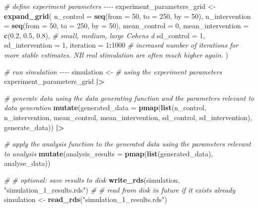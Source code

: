 \documentclass[
]{article}
\newenvironment{Shaded}{\begin{snugshade}}{\end{snugshade}}
\newcommand{\AttributeTok}[1]{\textcolor[rgb]{0.13,0.29,0.53}{#1}}
\newcommand{\CommentTok}[1]{\textcolor[rgb]{0.56,0.35,0.01}{\textit{#1}}}
\newcommand{\DecValTok}[1]{\textcolor[rgb]{0.00,0.00,0.81}{#1}}
\newcommand{\FloatTok}[1]{\textcolor[rgb]{0.00,0.00,0.81}{#1}}
\newcommand{\FunctionTok}[1]{\textcolor[rgb]{0.13,0.29,0.53}{\textbf{#1}}}
\newcommand{\NormalTok}[1]{#1}
\newcommand{\OtherTok}[1]{\textcolor[rgb]{0.56,0.35,0.01}{#1}}
\newcommand{\SpecialCharTok}[1]{\textcolor[rgb]{0.81,0.36,0.00}{\textbf{#1}}}
\newcommand{\StringTok}[1]{\textcolor[rgb]{0.31,0.60,0.02}{#1}}
\begin{document}
\begin{Shaded}
\begin{Highlighting}[]
\CommentTok{\# define experiment parameters {-}{-}{-}{-}}
\NormalTok{experiment\_parameters\_grid }\OtherTok{\textless{}{-}} \FunctionTok{expand\_grid}\NormalTok{(}
  \AttributeTok{n\_control =} \FunctionTok{seq}\NormalTok{(}\AttributeTok{from =} \DecValTok{50}\NormalTok{, }\AttributeTok{to =} \DecValTok{250}\NormalTok{, }\AttributeTok{by =} \DecValTok{50}\NormalTok{),}
  \AttributeTok{n\_intervention =} \FunctionTok{seq}\NormalTok{(}\AttributeTok{from =} \DecValTok{50}\NormalTok{, }\AttributeTok{to =} \DecValTok{250}\NormalTok{, }\AttributeTok{by =} \DecValTok{50}\NormalTok{),}
  \AttributeTok{mean\_control =} \DecValTok{0}\NormalTok{,}
  \AttributeTok{mean\_intervention =} \FunctionTok{c}\NormalTok{(}\FloatTok{0.2}\NormalTok{, }\FloatTok{0.5}\NormalTok{, }\FloatTok{0.8}\NormalTok{), }\CommentTok{\# small, medium, large Cohen\textquotesingle{}s d}
  \AttributeTok{sd\_control =} \DecValTok{1}\NormalTok{,}
  \AttributeTok{sd\_intervention =} \DecValTok{1}\NormalTok{,}
  \AttributeTok{iteration =} \DecValTok{1}\SpecialCharTok{:}\DecValTok{1000} \CommentTok{\# increased number of iterations for more stable estimates. NB real stimulation are often much higher again.}
\NormalTok{)}


\CommentTok{\# run simulation {-}{-}{-}{-}}
\NormalTok{simulation }\OtherTok{\textless{}{-}} 
  \CommentTok{\# using the experiment parameters}
\NormalTok{  experiment\_parameters\_grid }\SpecialCharTok{|\textgreater{}}
  
  \CommentTok{\# generate data using the data generating function and the parameters relevant to data generation}
  \FunctionTok{mutate}\NormalTok{(}\AttributeTok{generated\_data =} \FunctionTok{pmap}\NormalTok{(}\FunctionTok{list}\NormalTok{(n\_control,}
\NormalTok{                                    n\_intervention,}
\NormalTok{                                    mean\_control,}
\NormalTok{                                    mean\_intervention,}
\NormalTok{                                    sd\_control,}
\NormalTok{                                    sd\_intervention),}
\NormalTok{                               generate\_data)) }\SpecialCharTok{|\textgreater{}}
  
  \CommentTok{\# apply the analysis function to the generated data using the parameters relevant to analysis}
  \FunctionTok{mutate}\NormalTok{(}\AttributeTok{analysis\_results =} \FunctionTok{pmap}\NormalTok{(}\FunctionTok{list}\NormalTok{(generated\_data),}
\NormalTok{                                 analyse\_data))}
  

\CommentTok{\# \# optional: save results to disk}
\FunctionTok{write\_rds}\NormalTok{(simulation, }\StringTok{"simulation\_1\_results.rds"}\NormalTok{)}
\CommentTok{\# \# read from disk in future if it exists already}
\NormalTok{simulation }\OtherTok{\textless{}{-}} \FunctionTok{read\_rds}\NormalTok{(}\StringTok{"simulation\_1\_results.rds"}\NormalTok{)}



\end{Highlighting}
\end{Shaded}
\end{document}
